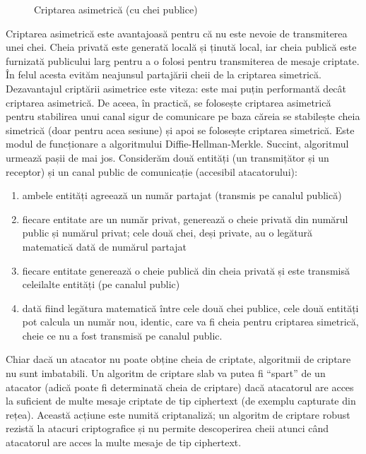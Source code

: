 \begin{figure}[htbp]
  \centering
  \def\svgwidth{\columnwidth}
  
  \caption{Criptarea asimetrică (cu chei publice)}
  \label{fig:sec:asymmetric-encryption}
\end{figure}

Criptarea asimetrică este avantajoasă pentru că nu este nevoie de transmiterea unei chei. Cheia privată este generată locală și ținută local, iar cheia publică este furnizată publicului larg pentru a o folosi pentru transmiterea de mesaje criptate. În felul acesta evităm neajunsul partajării cheii de la criptarea simetrică. Dezavantajul criptării asimetrice este viteza: este mai puțin performantă decât criptarea asimetrică. De aceea, în practică, se folosește criptarea asimetrică pentru stabilirea unui canal sigur de comunicare pe baza căreia se stabilește cheia simetrică (doar pentru acea sesiune) și apoi se folosește criptarea simetrică. Este modul de funcționare a algoritmului Diffie-Hellman-Merkle. Succint, algoritmul urmează pașii de mai jos. Considerăm două entități (un transmițător și un receptor) și un canal public de comunicație (accesibil atacatorului):

\begin{enumerate}
  \item ambele entități agreează un număr partajat (transmis pe canalul publică)
  \item fiecare entitate are un număr privat, generează o cheie privată din numărul public și numărul privat; cele două chei, deși private, au o legătură matematică dată de numărul partajat
  \item fiecare entitate generează o cheie publică din cheia privată și este transmisă celeilalte entități (pe canalul public)
  \item dată fiind legătura matematică între cele două chei publice, cele două entități pot calcula un număr nou, identic, care va fi cheia pentru criptarea simetrică, cheie ce nu a fost transmisă pe canalul public.
\end{enumerate}

Chiar dacă un atacator nu poate obține cheia de criptate, algoritmii de criptare nu sunt imbatabili. Un algoritm de criptare slab va putea fi “spart” de un atacator (adică poate fi determinată cheia de criptare) dacă atacatorul are acces la suficient de multe mesaje criptate de tip ciphertext (de exemplu capturate din rețea). Această acțiune este numită criptanaliză; un algoritm de criptare robust rezistă la atacuri criptografice și nu permite descoperirea cheii atunci când atacatorul are acces la multe mesaje de tip ciphertext.

